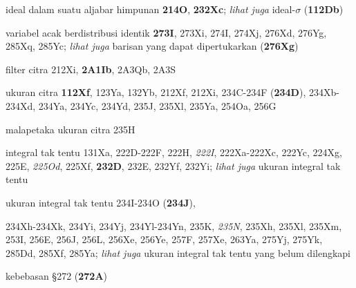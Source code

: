 \indexmedskip

ideal dalam suatu aljabar himpunan {\bf 214O}, {\bf 232Xc};  
  {\it lihat juga} ideal-$\sigma$ ({\bf 112Db})













variabel acak berdistribusi identik {\bf 273I}, 273Xi,
274I, 274Xj, 276Xd, 276Yg, 285Xq, 285Yc;  
  {\it lihat juga} barisan yang dapat dipertukarkan ({\bf 276Xg})




filter citra 212Xi, {\bf 2A1Ib}, 2A3Qb, 2A3S


ukuran citra {\bf 112Xf}, 123Ya, 132Yb,
  212Xf, 212Xi,
234C-234F ({\bf 234D}), 
234Xb-234Xd, 
234Ya, 234Yc, 234Yd, 235J, 235Xl,
235Ya, 254Oa, 256G


malapetaka ukuran citra 235H






























integral tak tentu 131Xa,
  222D-222F, 
222H, {\it 222I}, 222Xa-222Xc, 
222Yc, 224Xg, 225E, {\it 225Od}, 225Xf, {\bf 232D}, 232E, 232Yf, 232Yi;
  {\it lihat juga }
ukuran integral tak tentu
  

ukuran integral tak tentu 234I-234O ({\bf 234J}),
  
234Xh-234Xk, 
234Yi, 234Yj, 234Yl-234Yn, 
235K, {\it 235N}, 235Xh, 235Xl, 235Xm,
253I, 256E, 256J, 256L, 256Xe, 256Ye, 257F, 257Xe, 263Ya, 275Yj, 275Yk,
285Dd, 285Xf, 285Ya;
  {\it lihat juga} ukuran integral tak tentu yang belum dilengkapi


kebebasan \S272 ({\bf 272A})










